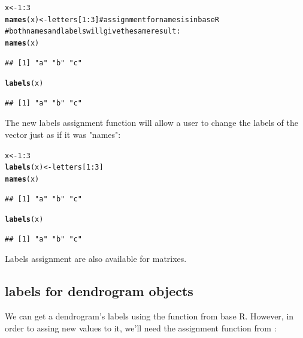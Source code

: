 \documentclass[shortnames,nojss,article]{jss}\usepackage{graphicx, color}
\makeatletter
\newcommand{\hlfunctioncall}[1]{\textcolor[rgb]{0.501960784313725,0,0.329411764705882}{\textbf{#1}}}%
\newcommand{\hlcomment}[1]{\textcolor[rgb]{0.180392156862745,0.6,0.341176470588235}{#1}}%
\newenvironment{kframe}{%
 \def\at@end@of@kframe{}%
 \ifinner\ifhmode%
  \def\at@end@of@kframe{\end{minipage}}%
  \begin{minipage}{\columnwidth}%
 \fi\fi%
 \def\FrameCommand##1{\hskip\@totalleftmargin \hskip-\fboxsep
 \colorbox{shadecolor}{##1}\hskip-\fboxsep
     \hskip-\linewidth \hskip-\@totalleftmargin \hskip\columnwidth}%
 \MakeFramed {\advance\hsize-\width
   \@totalleftmargin\z@ \linewidth\hsize
   \@setminipage}}%
 {\par\unskip\endMakeFramed%
 \at@end@of@kframe}
\newenvironment{knitrout}{}{} %
\makeatother
\begin{document}
\begin{knitrout}
\color{fgcolor}\begin{kframe}
\begin{alltt}
x <- 1:3
\hlfunctioncall{names}(x) <- letters[1:3]  \hlcomment{# assignment for names is in base R}
\hlcomment{# both names and labels will give the same result:}
\hlfunctioncall{names}(x)
\end{alltt}
\begin{verbatim}
## [1] "a" "b" "c"
\end{verbatim}
\begin{alltt}
\hlfunctioncall{labels}(x)
\end{alltt}
\begin{verbatim}
## [1] "a" "b" "c"
\end{verbatim}
\end{kframe}
\end{knitrout}



The new labels assignment function will allow a user to change the labels of the vector just as if it was "names":

\begin{knitrout}
\color{fgcolor}\begin{kframe}
\begin{alltt}
x <- 1:3
\hlfunctioncall{labels}(x) <- letters[1:3]
\hlfunctioncall{names}(x)
\end{alltt}
\begin{verbatim}
## [1] "a" "b" "c"
\end{verbatim}
\begin{alltt}
\hlfunctioncall{labels}(x)
\end{alltt}
\begin{verbatim}
## [1] "a" "b" "c"
\end{verbatim}
\end{kframe}
\end{knitrout}


Labels assignment are also available for matrixes.


\subsection{labels for dendrogram objects}

We can get a dendrogram's labels using the  function from base R. However, in order to assing new values to it, we'll need the assignment function from :
\end{document}
